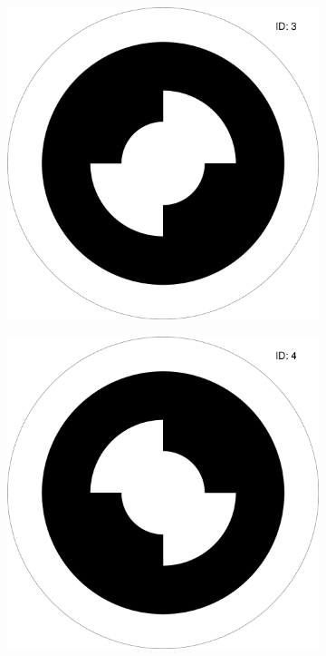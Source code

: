 \begin{figure}[ht]
\begin{subfigure}[b]{0.23\textwidth}
        \label{subfig:whycode_2}
    \end{subfigure}
    \begin{subfigure}[b]{0.23\textwidth}
        \centering
        \includegraphics[width=\textwidth]{images/00000003.png}
        \label{subfig:whycode_3}
    \end{subfigure}
    \begin{subfigure}[b]{0.23\textwidth}
        \centering
        \includegraphics[width=\textwidth]{images/00000004.png}

\end{subfigure}
\end{figure}

